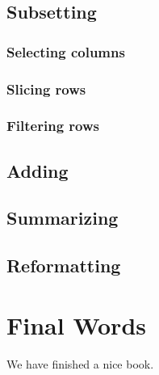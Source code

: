 \documentclass[]{tufte-book}
\begin{document}
\hypertarget{subsetting}{%
\section{Subsetting}\label{subsetting}}

\hypertarget{selecting-columns}{%
\subsection{Selecting columns}\label{selecting-columns}}

\hypertarget{slicing-rows}{%
\subsection{Slicing rows}\label{slicing-rows}}

\hypertarget{filtering-rows}{%
\subsection{Filtering rows}\label{filtering-rows}}

\hypertarget{adding}{%
\section{Adding}\label{adding}}

\hypertarget{summarizing}{%
\section{Summarizing}\label{summarizing}}

\hypertarget{reformatting}{%
\section{Reformatting}\label{reformatting}}

\hypertarget{final-words}{%
\chapter{Final Words}\label{final-words}}

We have finished a nice book.


\end{document}
